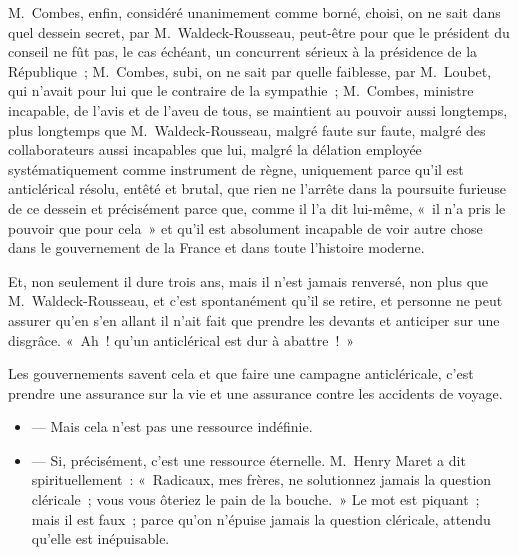\documentclass[french,twoside]{book} %
\begin{document}
M. Combes, enfin, considéré unanimement comme borné, choisi, on ne sait dans quel dessein secret, par M. Waldeck-Rousseau, peut-être pour que le président du conseil ne fût pas, le cas échéant, un concurrent sérieux à la présidence de la République ; M. Combes, subi, on ne sait par quelle faiblesse, par M. Loubet, qui n’avait pour lui que le contraire de la sympathie ; M. Combes, ministre incapable, de l’avis et de l’aveu de tous, se maintient au pouvoir aussi longtemps, plus longtemps que M. Waldeck-Rousseau, malgré faute sur faute, malgré des collaborateurs aussi incapables que lui, malgré la délation employée systématiquement comme instrument de règne, uniquement parce qu’il est anticlérical résolu, entêté et brutal, que rien ne l’arrête dans la poursuite furieuse de ce dessein et précisément parce que, comme il l’a dit lui-même, « il n’a pris le pouvoir que pour cela » et qu’il est absolument incapable de voir autre chose dans le gouvernement  de la France et dans toute l’histoire moderne.\par
Et, non seulement il dure trois ans, mais il n’est jamais renversé, non plus que M. Waldeck-Rousseau, et c’est spontanément qu’il se retire, et personne ne peut assurer qu’en s’en allant il n’ait fait que prendre les devants et anticiper sur une disgrâce. « Ah ! qu’un anticlérical est dur à abattre ! »\par
Les gouvernements savent cela et que faire une campagne anticléricale, c’est prendre une assurance sur la vie et une assurance contre les accidents de voyage.\par

\begin{itemize}[itemsep=0pt,]
\item  — Mais cela n’est pas une ressource indéfinie.
\item  — Si, précisément, c’est une ressource éternelle. M. Henry Maret a dit spirituellement : « Radicaux, mes frères, ne solutionnez jamais la question cléricale ; vous vous ôteriez le pain de la bouche. » Le mot est piquant ; mais il est faux ; parce qu’on n’épuise jamais la question cléricale, attendu qu’elle est inépuisable.
\end{itemize}
\end{document}
